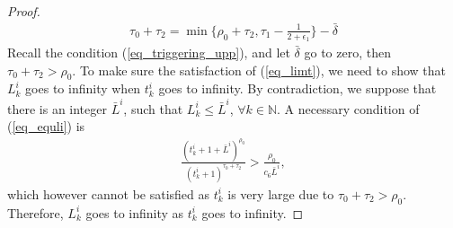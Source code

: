 \documentclass[10pt,journal,final]{IEEEtran}
\theoremstyle{plain}
\theoremstyle{definition}
\theoremstyle{remark}
\begin{document}
\begin{proof}
\begin{align*}
\tau_0+\tau_2=\min\{\rho_0+\tau_2,\tau_1-\frac{1}{2+\epsilon_1}\}-\bar\delta
\end{align*}
Recall the condition (\ref{eq_triggering_upp}), and let $\bar\delta$ go to zero, then $\tau_0+\tau_2>\rho_0.$
%
To make sure the satisfaction of (\ref{eq_limt}), we need to show that $L_{k}^i$ goes to infinity when $t_{k}^i$ goes to infinity. By contradiction, we suppose that there is an integer $\bar L^i$, such that $L_{k}^i\leq \bar L^i$, $\forall k\in\mathbb{N}$. A necessary condition of (\ref{eq_equli}) is 
\begin{align}
\frac{(t_{k}^i+1+\bar L^i)^{\rho_0}}{(t_{k}^i+1)^{\tau_0+\tau_2}}>\frac{\rho_0}{c_6\bar L^i},
\end{align}
which however cannot be satisfied as $t_{k}^i$ is very large due to $\tau_0+\tau_2>\rho_0$. Therefore, $L_{k}^i$ goes to infinity as $t_{k}^i$ goes to infinity.
\end{proof}
\end{document}
